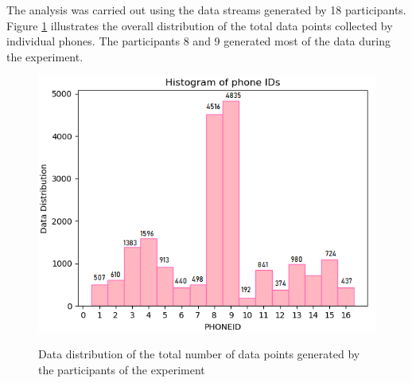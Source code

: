
The analysis was carried out using the data streams generated by 18 participants. Figure \ref{userphone} illustrates the overall distribution of the total data points collected by individual phones. The participants 8 and 9 generated most of the data during the experiment.  


\begin{figure}[!ht]
    \centering
    \includegraphics[width=.7\textwidth]{image/Chapters/Chapter6/phoneID_data.png}
    \\[\smallskipamount]    
    \caption{Data distribution of the total number of data points generated by the participants of the experiment}
    \label{userphone}
\end{figure}







